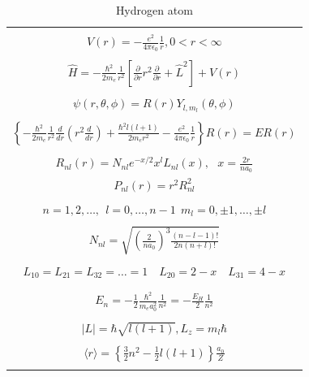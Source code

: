 \documentclass[11pt]{article}
\begin{document}
\begin{table}[tbh]
   \begin{center}
   \caption{Hydrogen atom}
    \label{Hydrogen atom}
\begin{tabular}[h]{|c|}
\hline
 \\
$\displaystyle       V(r) = -\frac{e^2}{4\pi\epsilon_0}\frac{1}{r}, 0 < r< \infty$ \\
 \\
$\displaystyle     \hat H = -\frac{\hbar^2}{2m_e}\frac{1}{r^2}\left [
  \frac{\partial}{\partial r}r^2\frac{\partial}{\partial r} + \hat L^2 \right ] +V(r)$ \\
\\
$\displaystyle \psi(r,\theta,\phi) = R(r)Y_{l,m_l}(\theta,\phi) $ \\
\\
$\displaystyle   \left \{ -\frac{\hbar^2}{2m_e}\frac{1}{r^2}
            \frac{d}{d r} \left ( r^2 \frac{d}{dr}\right ) + \frac{\hbar^2
              l(l+1)}{2 m_e r^2}
          -\frac{e^2}{4\pi\epsilon_0}\frac{1}{r}\right \} R(r) = E R(r) $ \\
\\
$\displaystyle R_{nl}(r) = N_{nl} e^{-x/2} x^l L_{nl}(x),\ \ \  x = \frac{2 r}{n a_0} $
\\
$\displaystyle P_{nl}(r) = r^2 R_{nl}^2 $
\\
\\
$\displaystyle n = 1, 2, \ldots,\ \  l = 0, \ldots, n-1 \ \ m_l = 0,\pm 1, \ldots, \pm l$
\\
\\
$\displaystyle N_{nl} = \sqrt{\left ( \frac{2}{na_0}\right )^3 \frac{(n-l-1)!}{2n(n+l)!}}$
\\
\\
$\displaystyle L_{10} = L_{21} = L_{32} = \ldots =1 \quad L_{20} = 2 - x \quad L_{31} = 4-x$
\\
\\
\\
$\displaystyle     E_{n}=-\frac{1}{2}\frac{\hbar^2}{m_e a_0^2}\frac{1}{n^2} =-\frac{E_H}{2}\frac{1}{n^2}$ \\
 \\
$\displaystyle |L| = \hbar \sqrt{l(l+1)}, L_z = m_l \hbar $ \\
\\
$\displaystyle \langle r \rangle = \left \{ \frac{3}{2} n^2 - \frac{1}{2} l(l+1) \right \} \frac{a_0}{Z} $ \\
\\
\hline
\end{tabular}
 \end{center}
\end{table}
\end{document}

